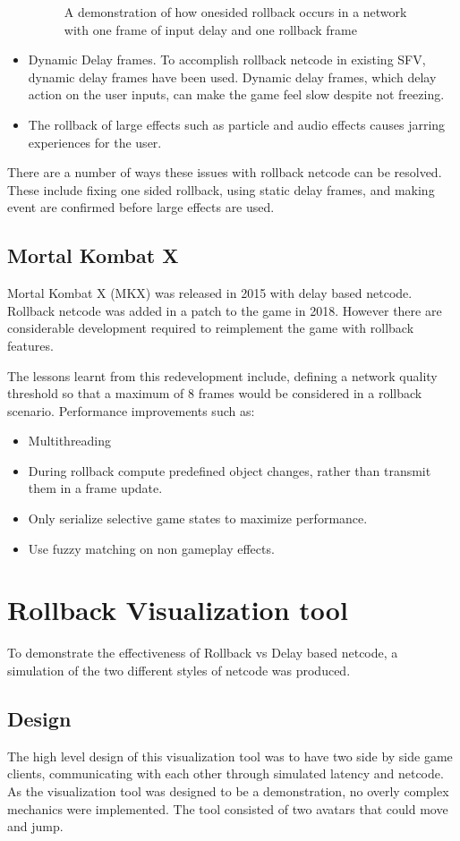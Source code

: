 \documentclass{entcs}
\begin{document}
\begin{itemize}
\begin{figure}[H]
{\begin{tabular}{c|c|c|c|c}
\hline
\end{tabular}
}
\caption{A demonstration of how onesided rollback occurs in a network with one frame of input delay and one rollback frame}
\label{fig:OneSided}
\end{figure}
\item Dynamic Delay frames. \cite{SFV 1}
To accomplish rollback netcode in existing SFV, dynamic delay frames have been used.
Dynamic delay frames, which delay action on the user inputs, can make the game feel slow despite not freezing. 
\item The rollback of large effects such as particle and audio effects causes jarring experiences for the user\cite{SFV 1}.
\end{itemize}
There are a number of ways these issues with rollback netcode can be resolved. These include fixing one sided rollback, using static delay frames, and making event are confirmed before large effects are used.

\subsection{Mortal Kombat X}
Mortal Kombat X (MKX) was released in 2015 with delay based netcode. Rollback netcode was added in a patch to the game in 2018. However there are considerable development required to reimplement the game with rollback features.

The lessons learnt from this redevelopment include, defining a network quality threshold so that a maximum of 8 frames would be considered in a rollback scenario. Performance improvements such as:
\begin{itemize}
\item Multithreading
\item During rollback compute predefined object changes, rather than transmit them in a frame update.
\item Only serialize selective game states to maximize performance.
\item Use fuzzy matching on non gameplay effects.
\end{itemize}

\section{Rollback Visualization tool}
To demonstrate the effectiveness of Rollback vs Delay based netcode, a simulation of the two different styles of netcode was produced.
\subsection{Design}
The high level design of this visualization tool was to have two side by side game clients, communicating with each other through simulated latency and netcode. As the visualization tool was designed to be a demonstration, no overly complex mechanics were implemented. The tool consisted of two avatars that could move and jump.
\end{document}

